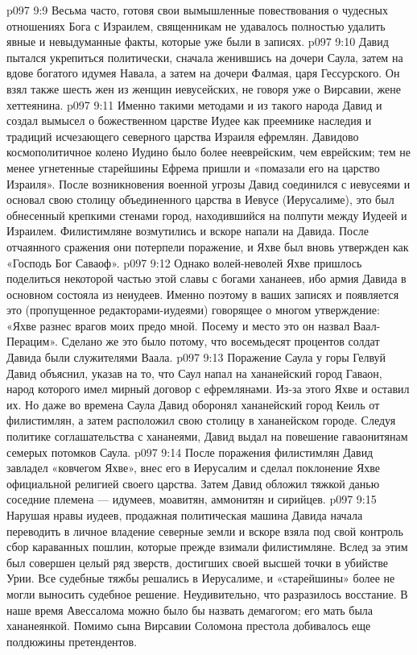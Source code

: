 \vs p097 9:9 Весьма часто, готовя свои вымышленные повествования о чудесных отношениях Бога с Израилем, священникам не удавалось полностью удалить явные и невыдуманные факты, которые уже были в записях.
\vs p097 9:10 \pc Давид пытался укрепиться политически, сначала женившись на дочери Саула, затем на вдове богатого идумея Навала, а затем на дочери Фалмая, царя Гессурского. Он взял также шесть жен из женщин иевусейских, не говоря уже о Вирсавии, жене хеттеянина.
\vs p097 9:11 Именно такими методами и из такого народа Давид и создал вымысел о божественном царстве Иудее как преемнике наследия и традиций исчезающего северного царства Израиля ефремлян. Давидово космополитичное колено Иудино было более нееврейским, чем еврейским; тем не менее угнетенные старейшины Ефрема пришли и «помазали его на царство Израиля». После возникновения военной угрозы Давид соединился с иевусеями и основал свою столицу объединенного царства в Иевусе (Иерусалиме), это был обнесенный крепкими стенами город, находившийся на полпути между Иудеей и Израилем. Филистимляне возмутились и вскоре напали на Давида. После отчаянного сражения они потерпели поражение, и Яхве был вновь утвержден как «Господь Бог Саваоф».
\vs p097 9:12 Однако волей\hyp{}неволей Яхве пришлось поделиться некоторой частью этой славы с богами хананеев, ибо армия Давида в основном состояла из неиудеев. Именно поэтому в ваших записях и появляется это (пропущенное редакторами\hyp{}иудеями) говорящее о многом утверждение: «Яхве разнес врагов моих предо мной. Посему и место это он назвал Ваал\hyp{}Перацим». Сделано же это было потому, что восемьдесят процентов солдат Давида были служителями Ваала.
\vs p097 9:13 Поражение Саула у горы Гелвуй Давид объяснил, указав на то, что Саул напал на хананейский город Гаваон, народ которого имел мирный договор с ефремлянами. Из\hyp{}за этого Яхве и оставил их. Но даже во времена Саула Давид оборонял хананейский город Кеиль от филистимлян, а затем расположил свою столицу в хананейском городе. Следуя политике соглашательства с хананеями, Давид выдал на повешение гаваонитянам семерых потомков Саула.
\vs p097 9:14 После поражения филистимлян Давид завладел «ковчегом Яхве», внес его в Иерусалим и сделал поклонение Яхве официальной религией своего царства. Затем Давид обложил тяжкой данью соседние племена --- идумеев, моавитян, аммонитян и сирийцев.
\vs p097 9:15 Нарушая нравы иудеев, продажная политическая машина Давида начала переводить в личное владение северные земли и вскоре взяла под свой контроль сбор караванных пошлин, которые прежде взимали филистимляне. Вслед за этим был совершен целый ряд зверств, достигших своей высшей точки в убийстве Урии. Все судебные тяжбы решались в Иерусалиме, и «старейшины» более не могли выносить судебное решение. Неудивительно, что разразилось восстание. В наше время Авессалома можно было бы назвать демагогом; его мать была хананеянкой. Помимо сына Вирсавии Соломона престола добивалось еще полдюжины претендентов.
